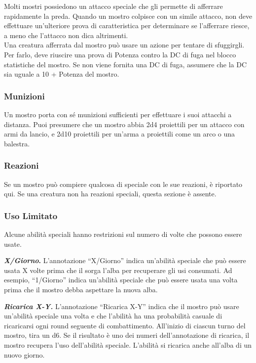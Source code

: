 Molti mostri possiedono un attacco speciale che gli permette di afferrare rapidamente la preda. Quando un mostro colpisce con un simile attacco, non deve effettuare un'ulteriore prova di caratteristica per determinare se l'afferrare riesce, a meno che l'attacco non dica altrimenti.\\
Una creatura afferrata dal mostro può usare un azione per tentare di sfuggirgli. Per farlo, deve riuscire una prova di Potenza contro la DC di fuga nel blocco statistiche del mostro. Se non viene fornita una DC di fuga, assumere che la DC sia uguale a 10 + Potenza del mostro.

\subsubsection{Munizioni}

Un mostro porta con sé munizioni sufficienti per effettuare i suoi attacchi a distanza. Puoi presumere che un mostro abbia 2d4 proiettili per un attacco con armi da lancio, e 2d10 proiettili per un'arma a proiettili come un arco o una balestra.

\subsubsection{Reazioni}

Se un mostro può compiere qualcosa di speciale con le sue reazioni, è riportato qui. Se una creatura non ha reazioni speciali, questa sezione è assente.

\subsubsection{Uso Limitato}

Alcune abilità speciali hanno restrizioni sul numero di volte che
possono essere usate.

\textbf{\emph{X/Giorno}.} L'annotazione ``X/Giorno'' indica un'abilità speciale che può essere usata X volte prima che il sorga l'alba per recuperare gli usi consumati. Ad esempio, ``1/Giorno'' indica un'abilità speciale che può essere usata una volta prima che il mostro debba aspettare la nuova alba.

\emph{\textbf{Ricarica X-Y.}} L'annotazione ``Ricarica X-Y'' indica che il mostro può usare un'abilità speciale una volta e che l'abilità ha una probabilità casuale di ricaricarsi ogni round seguente di combattimento. All'inizio di ciascun turno del mostro, tira un d6. Se il risultato è uno dei numeri dell'annotazione di ricarica, il mostro recupera l'uso dell'abilità speciale. L'abilità si ricarica anche all'alba di un nuovo giorno.

